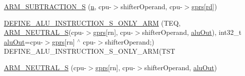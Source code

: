 \begin{DoxyCompactItemize}
\item 
\mbox{\hyperlink{isa-arm_8c_a59e960f6d072b3677bd8a240559a5813}{A\+R\+M\+\_\+\+S\+U\+B\+T\+R\+A\+C\+T\+I\+O\+N\+\_\+S}} (\mbox{\hyperlink{isa-lr35902_8c_ae54e54065504090672c92ef62a1c5f05}{n}}, cpu-\/$>$shifter\+Operand, cpu-\/$>$\mbox{\hyperlink{isa-thumb_8c_a6b4b7e13a9a144391615b217c5917bc7}{gprs}}\mbox{[}\mbox{\hyperlink{isa-arm_8c_a555541ce18ed9b5fad657a06b22cb465}{rd}}\mbox{]})
\item 
\mbox{\hyperlink{isa-arm_8c_ac2ed49ca99a52a2764bcd8dfc18a5de6}{D\+E\+F\+I\+N\+E\+\_\+\+A\+L\+U\+\_\+\+I\+N\+S\+T\+R\+U\+C\+T\+I\+O\+N\+\_\+\+S\+\_\+\+O\+N\+L\+Y\+\_\+\+A\+RM}} (T\+EQ, \mbox{\hyperlink{isa-arm_8c_ae0c54b99e326604c0849bad3030d8066}{A\+R\+M\+\_\+\+N\+E\+U\+T\+R\+A\+L\+\_\+S}}(cpu-\/$>$\mbox{\hyperlink{isa-thumb_8c_a6b4b7e13a9a144391615b217c5917bc7}{gprs}}\mbox{[}rn\mbox{]}, cpu-\/$>$shifter\+Operand, \mbox{\hyperlink{isa-arm_8c_abb37005c27e4a13f1e19fb44cb8288cb}{alu\+Out}}), int32\+\_\+t \mbox{\hyperlink{isa-arm_8c_abb37005c27e4a13f1e19fb44cb8288cb}{alu\+Out}}=cpu-\/$>$\mbox{\hyperlink{isa-thumb_8c_a6b4b7e13a9a144391615b217c5917bc7}{gprs}}\mbox{[}rn\mbox{]} $^\wedge$ cpu-\/$>$shifter\+Operand;) D\+E\+F\+I\+N\+E\+\_\+\+A\+L\+U\+\_\+\+I\+N\+S\+T\+R\+U\+C\+T\+I\+O\+N\+\_\+\+S\+\_\+\+O\+N\+L\+Y\+\_\+\+A\+RM(T\+ST
\item 
\mbox{\hyperlink{isa-arm_8c_ae0c54b99e326604c0849bad3030d8066}{A\+R\+M\+\_\+\+N\+E\+U\+T\+R\+A\+L\+\_\+S}} (cpu-\/$>$\mbox{\hyperlink{isa-thumb_8c_a6b4b7e13a9a144391615b217c5917bc7}{gprs}}\mbox{[}rn\mbox{]}, cpu-\/$>$shifter\+Operand, \mbox{\hyperlink{isa-arm_8c_abb37005c27e4a13f1e19fb44cb8288cb}{alu\+Out}})
\item 

\end{DoxyCompactItemize}

